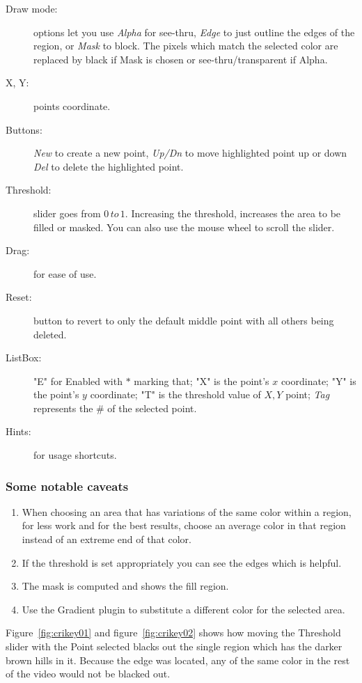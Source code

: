 \begin{description}
    \item[Draw mode:] options let you use \textit{Alpha} for see-thru, \textit{Edge} to just outline the edges of the region, or \textit{Mask} to block. The pixels which match the selected color are replaced by black if Mask is chosen or see-thru/transparent if Alpha.
    \item[X, Y:] points coordinate.
    \item[Buttons:] \textit{New} to create a new point, \textit{Up/Dn} to move highlighted point up or down \textit{Del} to delete the highlighted point.
    \item[Threshold:] slider goes from $0\, to\, 1$. Increasing the threshold, increases the area to be filled or masked. You can also use the mouse wheel to scroll the slider.
    \item[Drag:] for ease of use.
    \item[Reset:] button to revert to only the default middle point with all others being deleted.
    \item[ListBox:] "E" for Enabled with $*$ marking that; "X" is the point’s $x$ coordinate; "Y" is the point’s $y$ coordinate; "T" is the threshold value of $X,Y$ point; \textit{Tag} represents the \# of the selected 
    point.
    \item[Hints:] for usage shortcuts.
\end{description}

\subsubsection*{Some notable caveats}
\label{ssub:some_notable_caveats}

\begin{enumerate}
    \item When choosing an area that has variations of the same color within a region, for less work and for the best results, choose an average color in that region instead of an extreme end of that color.
    \item If the threshold is set appropriately you can see the edges which is helpful.
    \item The mask is computed and shows the fill region.
    \item Use the Gradient plugin to substitute a different color for the selected area.
\end{enumerate}

Figure~\ref{fig:crikey01} and figure~\ref{fig:crikey02} shows how moving the Threshold slider with the Point selected blacks out the single region which has the darker brown hills in it. Because the edge was located, any of the same color in the rest of the video would not be blacked out.

